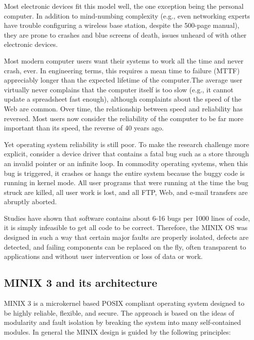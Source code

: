 Most electronic devices fit this model well, the one exception being the personal computer. In addition to mind-numbing complexity (e.g., even networking experts have trouble configuring a wireless base station, despite the 500-page manual), they are prone to crashes and blue screens of death, issues unheard of with other electronic devices.

Most modern computer users want their systems to work all the time and never crash, ever. In engineering terms, this requires a mean time to failure (MTTF) appre­ciably longer than the expected lifetime of the computer.The average user virtually never complains that the com­puter itself is too slow (e.g., it cannot update a spread­sheet fast enough), although complaints about the speed of the Web are common. Over time, the relationship be­tween speed and reliability has reversed. Most users now consider the reliability of the computer to be far more im­portant than its speed, the reverse of 40 years ago.

Yet operating system reliability is still poor. To make the research challenge more explicit, consider a device driver that contains a fatal bug such as a store through an invalid pointer or an infinite loop. In commodity op­erating systems, when this bug is triggered, it crashes or hangs the entire system because the buggy code is run­ning in kernel mode. All user programs that were run­ning at the time the bug struck are killed, all user work is lost, and all FTP, Web, and e-mail transfers are abruptly aborted.

Studies have shown that software contains about 6-16 bugs per 1000 lines of code, it is simply infeasible to get all code to be correct. Therefore, the MINIX OS was designed in such a way that certain major faults are properly isolated, defects are detected, and failing components can be replaced on the fly, often transparent to applications and without user intervention or loss of data or work.  

\subsection{MINIX 3 and its architecture}

MINIX 3 is a microkernel based POSIX compliant operating system designed to be highly reliable, flexible, and secure. The approach is based on the ideas of modularity and fault isolation by breaking the system into many self-contained modules. In general the MINIX design is guided by the following principles:

